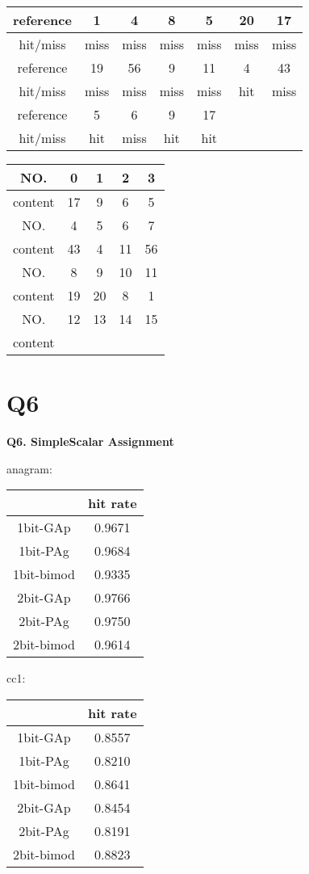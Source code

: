 \documentclass[12pt]{article}
\begin{document}
\begin{CJK*}{UTF8}{gbsn}
\begin{enumerate}[a)]
\begin{tabular}{|c|c|c|c|c|c|c|}
\hline 
reference	& 1 		& 4 		& 8 		&5& 20 	& 17 	 \\ 
\hline 
hit/miss		& miss 	& miss 	& miss 	&miss& miss 	& miss 	 \\ 
\hline 
reference &19& 56 & 9 & 11 & 4 & 43  \\ 
\hline 
hit/miss &miss& miss & miss & miss & hit & miss  \\ 
\hline
reference &5& 6 & 9 & 17 &&\\
\hline
hit/miss &hit& miss & hit &hit&&\\
\hline 
\end{tabular} 

\begin{tabular}{|c|c|c|c|c|}
\hline
NO. & 0 & 1 & 2 & 3 \\ 
\hline
content & 17 & 9 & 6 & 5 \\
\hline
NO. & 4 & 5 & 6 & 7\\
\hline
content & 43 & 4 & 11 & 56\\
\hline
NO. & 8 & 9 & 10 & 11\\
\hline
content & 19 & 20 & 8 & 1\\
\hline
NO. & 12&13&14&15\\
\hline
content &&&&\\
\hline
\end{tabular}

\end{enumerate}

\section{Q6}
\textbf{Q6. SimpleScalar Assignment}

anagram:\\
\begin{tabular}{|c|c|}
\hline 
  & hit rate \\ 
\hline 
1bit-GAp & 0.9671 \\ 
\hline 
1bit-PAg & 0.9684 \\ 
\hline 
1bit-bimod & 0.9335 \\ 
\hline 
2bit-GAp & 0.9766 \\ 
\hline 
2bit-PAg & 0.9750 \\ 
\hline 
2bit-bimod & 0.9614 \\ 
\hline 
\end{tabular} 

cc1:\\
\begin{tabular}{|c|c|}
\hline 
 & hit rate \\ 
\hline 
1bit-GAp & 0.8557 \\ 
\hline 
1bit-PAg & 0.8210 \\ 
\hline 
1bit-bimod & 0.8641 \\ 
\hline 
2bit-GAp & 0.8454 \\ 
\hline 
2bit-PAg & 0.8191 \\ 
\hline 
2bit-bimod & 0.8823 \\ 
\hline 
\end{tabular} 


\end{CJK*}
\end{document}
